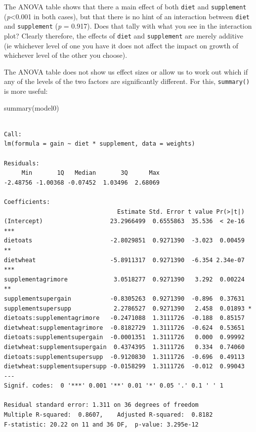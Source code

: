\documentclass[
  letterpaper,
  DIV=11,
  numbers=noendperiod]{scrreprt}
\newenvironment{Shaded}{\begin{snugshade}}{\end{snugshade}}
\newcommand{\FunctionTok}[1]{\textcolor[rgb]{0.28,0.35,0.67}{#1}}
\newcommand{\NormalTok}[1]{\textcolor[rgb]{0.00,0.23,0.31}{#1}}
\begin{document}
The ANOVA table shows that there a main effect of both \texttt{diet} and
\texttt{supplement} (\emph{p}\textless0.001 in both cases), but that
there is no hint of an interaction between \texttt{diet} and
\texttt{supplement} (\emph{p} = 0.917). Does that tally with what you
see in the interaction plot? Clearly therefore, the effects of
\texttt{diet} and \texttt{supplement} are merely additive (ie whichever
level of one you have it does not affect the impact on growth of
whichever level of the other you choose).

The ANOVA table does not show us effect sizes or allow us to work out
which if any of the levels of the two factors are significantly
different. For this, \texttt{summary()} is more useful:

\begin{Shaded}
\begin{Highlighting}[]
\FunctionTok{summary}\NormalTok{(model0)}
\end{Highlighting}
\end{Shaded}

\begin{verbatim}

Call:
lm(formula = gain ~ diet * supplement, data = weights)

Residuals:
     Min       1Q   Median       3Q      Max 
-2.48756 -1.00368 -0.07452  1.03496  2.68069 

Coefficients:
                                Estimate Std. Error t value Pr(>|t|)    
(Intercept)                   23.2966499  0.6555863  35.536  < 2e-16 ***
dietoats                      -2.8029851  0.9271390  -3.023  0.00459 ** 
dietwheat                     -5.8911317  0.9271390  -6.354 2.34e-07 ***
supplementagrimore             3.0518277  0.9271390   3.292  0.00224 ** 
supplementsupergain           -0.8305263  0.9271390  -0.896  0.37631    
supplementsupersupp            2.2786527  0.9271390   2.458  0.01893 *  
dietoats:supplementagrimore   -0.2471088  1.3111726  -0.188  0.85157    
dietwheat:supplementagrimore  -0.8182729  1.3111726  -0.624  0.53651    
dietoats:supplementsupergain  -0.0001351  1.3111726   0.000  0.99992    
dietwheat:supplementsupergain  0.4374395  1.3111726   0.334  0.74060    
dietoats:supplementsupersupp  -0.9120830  1.3111726  -0.696  0.49113    
dietwheat:supplementsupersupp -0.0158299  1.3111726  -0.012  0.99043    
---
Signif. codes:  0 '***' 0.001 '**' 0.01 '*' 0.05 '.' 0.1 ' ' 1

Residual standard error: 1.311 on 36 degrees of freedom
Multiple R-squared:  0.8607,    Adjusted R-squared:  0.8182 
F-statistic: 20.22 on 11 and 36 DF,  p-value: 3.295e-12
\end{verbatim}
\end{document}
